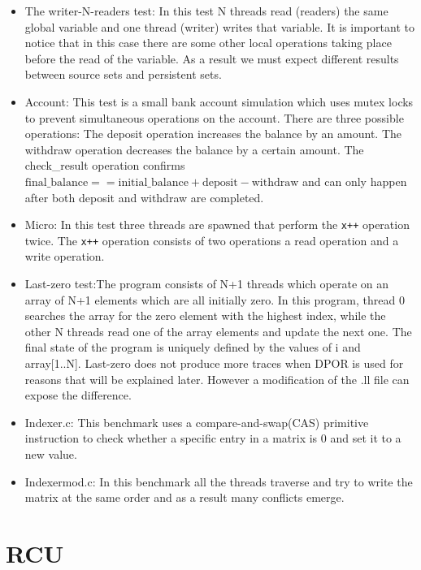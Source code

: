 \begin{itemize}
\item The writer-N-readers test: In this test N threads read (readers) the same global variable and one thread (writer)
writes that variable. It is important to notice that in this case there are some other local operations taking place
before the read of the variable. As a result we must expect different results between source sets and persistent sets.

\item Account: This test is a small bank account simulation which uses mutex locks to prevent simultaneous operations on
the account. There are three possible operations: The deposit operation increases the balance by an amount. The withdraw
operation decreases the balance by a certain amount. The check\_result operation confirms $\text{final\_balance} ==
\text{initial\_balance} + \text{deposit} - \text{withdraw}$ and can only happen after both deposit and withdraw are
completed.

\item Micro: In this test three threads are spawned that perform the \verb|x++| operation twice. The \verb|x++|
operation consists of two operations a read operation and a write operation.

\item Last-zero test:The program consists of N+1 threads which operate on an array of N+1 elements which are all
initially zero. In this program, thread 0 searches the array for the zero element with the highest index, while the
other N threads read one of the array elements and update the next one. The final state of the program is uniquely
defined by the values of i and array[1..N]. Last-zero does not produce more traces when DPOR is used for reasons that
will be explained later. However a modification of the .ll file can expose the difference.

\item Indexer.c: This benchmark uses a compare-and-swap(CAS) primitive instruction to check whether a specific entry in
a matrix is 0 and set it to a new value. 

\item Indexermod.c: In this benchmark all the threads traverse and try to write the matrix at the same order and as a
result many conflicts emerge.


\end{itemize}

\section{RCU}


